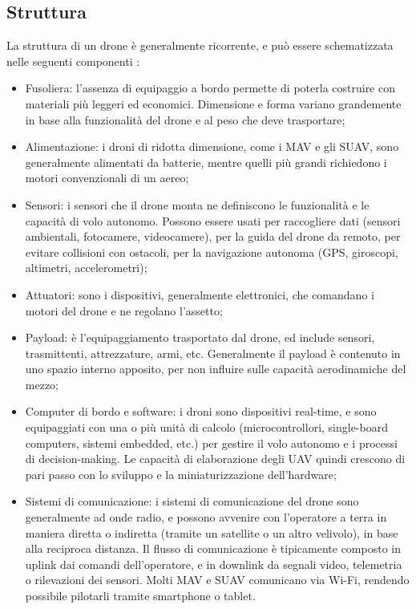 \subsection[Struttura]{Struttura}
La struttura di un drone è generalmente ricorrente, e può essere schematizzata nelle seguenti componenti \cite{sahingoz2014networking}:
\begin{itemize}
	\item Fusoliera: l'assenza di equipaggio a bordo permette di poterla costruire con materiali più leggeri ed economici. Dimensione e forma variano grandemente in base alla funzionalità del drone e al peso che deve trasportare;
	\item Alimentazione: i droni di ridotta dimensione, come i MAV e gli SUAV, sono generalmente alimentati da batterie, mentre quelli più grandi richiedono i motori convenzionali di un aereo;
	\item Sensori: i sensori che il drone monta ne definiscono le funzionalità e le capacità di volo autonomo. Possono essere usati per raccogliere dati (sensori ambientali, fotocamere, videocamere), per la guida del drone da remoto, per evitare collisioni con ostacoli, per la navigazione autonoma (GPS, giroscopi, altimetri, accelerometri);
	\item Attuatori: sono i dispositivi, generalmente elettronici, che comandano i motori del drone e ne regolano l'assetto;
	\item Payload: è l'equipaggiamento trasportato dal drone, ed include sensori, trasmittenti, attrezzature, armi, etc. Generalmente il payload è contenuto in uno spazio interno apposito, per non influire sulle capacità aerodinamiche del mezzo;
	\item Computer di bordo e software: i droni sono dispositivi real-time, e sono equipaggiati con una o più unità di calcolo (microcontrollori, single-board computers, sistemi embedded, etc.)  per gestire il volo autonomo e i processi di decision-making. Le capacità di elaborazione degli UAV quindi crescono di pari passo con lo sviluppo e la miniaturizzazione dell'hardware;
	\item Sistemi di comunicazione: i sistemi di comunicazione del drone sono generalmente ad onde radio, e possono avvenire con l'operatore a terra in maniera diretta o indiretta (tramite un satellite o un altro velivolo), in base alla reciproca distanza. Il flusso di comunicazione è tipicamente composto in uplink dai comandi dell'operatore, e in downlink da segnali video, telemetria o rilevazioni dei sensori. Molti  MAV e SUAV comunicano via Wi-Fi, rendendo possibile pilotarli tramite smartphone o tablet.  
\end{itemize}

